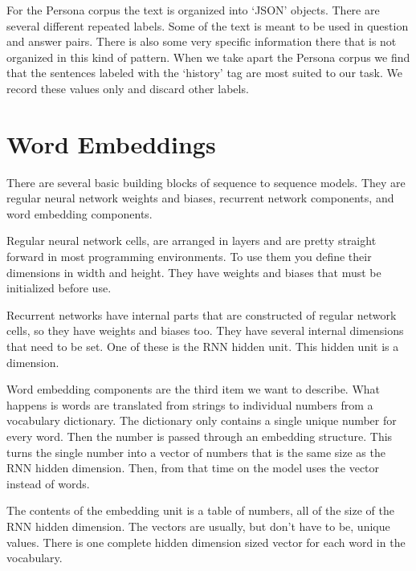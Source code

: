 For the Persona corpus the text is organized into `JSON' objects. There
are several different repeated labels. Some of the text is meant to be used in question and answer pairs. There is also some very specific information there that is not
organized in this kind of pattern. When we take apart the Persona corpus
we find that the sentences labeled with the `history' tag are most suited to our task.
We record these values only and discard other labels.
\fi

\iffalse
\section{Word Embeddings}

There are several basic building blocks of sequence to sequence models. They are regular neural network weights and biases, recurrent network components, and word embedding components.

Regular neural network cells, are arranged in layers and are pretty straight forward in most programming environments. To use them you define their dimensions in width and height. They have weights and biases that must be initialized before use.

Recurrent networks have internal parts that are constructed of regular network cells, so they have weights and biases too. They have several internal dimensions that need to be set. One of these is the RNN hidden unit. This hidden unit is a dimension.

Word embedding components are the third item we want to describe. What happens is words are translated from strings to individual numbers from a vocabulary dictionary. The dictionary only contains a single unique number for every word. Then the number is passed through an embedding structure. This turns the single number into a vector of numbers that is the same size as the RNN hidden dimension. Then, from that time on the model uses the vector instead of words.

The contents of the embedding unit is a table of numbers, all of the size of the RNN hidden dimension. The vectors are usually, but don\textquoteright t have to be, unique values. There is one complete hidden dimension sized vector for each word in the vocabulary. 

